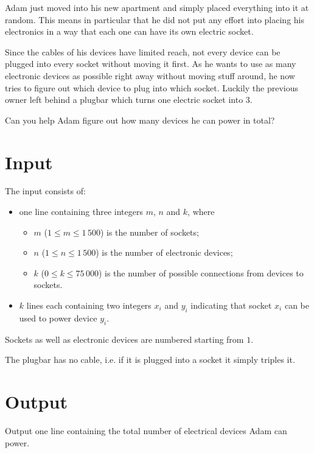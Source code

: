 
Adam just moved into his new apartment and simply placed everything into it at random. This means in particular that he did not put any effort into placing his electronics in a way that each one can have its own electric socket.

Since the cables of his devices have limited reach, not every device can be plugged into every socket without moving it first. As he wants to use as many electronic devices as possible right away without moving stuff around, he now tries to figure out which device to plug into which socket. Luckily the previous owner left behind a plugbar which turns one electric socket into $3$.

Can you help Adam figure out how many devices he can power in total?

\section*{Input}
The input consists of:
\begin{itemize}
	\item one line containing three integers $m$, $n$ and $k$, where
		\begin{itemize}
			\item $m$ ($1 \leq m \leq 1\,500$) is the number of sockets;
			\item $n$ ($1 \leq n \leq 1\,500$) is the number of electronic devices;
			\item $k$ ($0 \leq k \leq 75\,000$) is the number of possible connections from devices to sockets.
		\end{itemize}
	\item $k$ lines each containing two integers $x_i$ and $y_i$ indicating that socket $x_i$ can be used to power device $y_i$.
\end{itemize}
Sockets as well as electronic devices are numbered starting from $1$.

The plugbar has no cable, i.e. if it is plugged into a socket it simply triples it.



%

\section*{Output}

Output one line containing the total number of electrical devices Adam can power.


